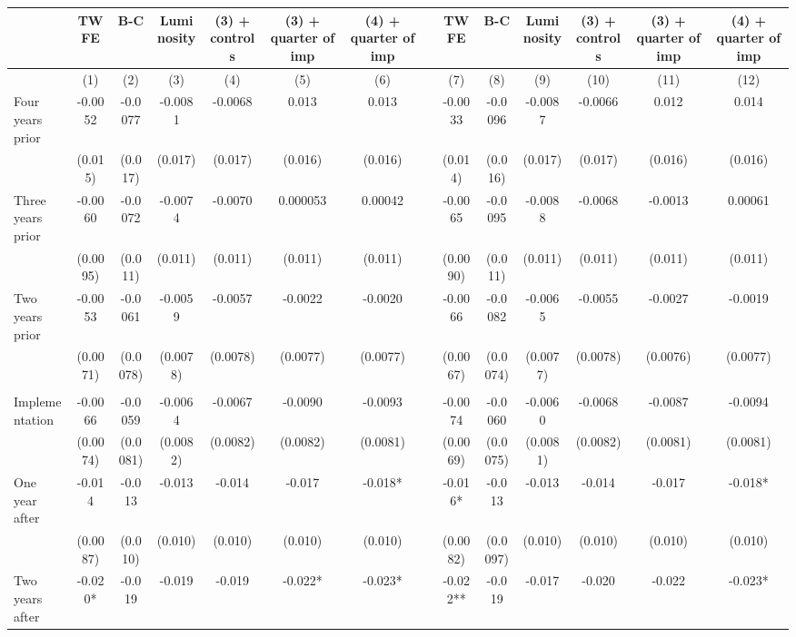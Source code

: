 \begin{tabular}{lccccccccccccc}
\toprule
      & TWFE  & B-C   & Luminosity & (3) + controls & (3) + quarter of imp & (4) + quarter of imp &       & TWFE  & B-C   & Luminosity & (3) + controls & (3) + quarter of imp & (4) + quarter of imp \\
\midrule
      & (1)   & (2)   & (3)   & (4)   & (5)   & (6)   &       & (7)   & (8)   & (9)   & (10)  & (11)  & (12) \\
\midrule
\midrule
Four years prior & -0.0052 & -0.0077 & -0.0081 & -0.0068 & 0.013 & 0.013 &       & -0.0033 & -0.0096 & -0.0087 & -0.0066 & 0.012 & 0.014 \\
      & (0.015) & (0.017) & (0.017) & (0.017) & (0.016) & (0.016) &       & (0.014) & (0.016) & (0.017) & (0.017) & (0.016) & (0.016) \\
Three years prior & -0.0060 & -0.0072 & -0.0074 & -0.0070 & 0.000053 & 0.00042 &       & -0.0065 & -0.0095 & -0.0088 & -0.0068 & -0.0013 & 0.00061 \\
      & (0.0095) & (0.011) & (0.011) & (0.011) & (0.011) & (0.011) &       & (0.0090) & (0.011) & (0.011) & (0.011) & (0.011) & (0.011) \\
Two years prior & -0.0053 & -0.0061 & -0.0059 & -0.0057 & -0.0022 & -0.0020 &       & -0.0066 & -0.0082 & -0.0065 & -0.0055 & -0.0027 & -0.0019 \\
      & (0.0071) & (0.0078) & (0.0078) & (0.0078) & (0.0077) & (0.0077) &       & (0.0067) & (0.0074) & (0.0077) & (0.0078) & (0.0076) & (0.0077) \\
      &       &       &       &       &       &       &       &       &       &       &       &       &  \\
Implementation & -0.0066 & -0.0059 & -0.0064 & -0.0067 & -0.0090 & -0.0093 &       & -0.0074 & -0.0060 & -0.0060 & -0.0068 & -0.0087 & -0.0094 \\
      & (0.0074) & (0.0081) & (0.0082) & (0.0082) & (0.0082) & (0.0081) &       & (0.0069) & (0.0075) & (0.0081) & (0.0082) & (0.0081) & (0.0081) \\
One year after & -0.014 & -0.013 & -0.013 & -0.014 & -0.017 & -0.018* &       & -0.016* & -0.013 & -0.013 & -0.014 & -0.017 & -0.018* \\
      & (0.0087) & (0.010) & (0.010) & (0.010) & (0.010) & (0.010) &       & (0.0082) & (0.0097) & (0.010) & (0.010) & (0.010) & (0.010) \\
Two years after & -0.020* & -0.019 & -0.019 & -0.019 & -0.022* & -0.023* &       & -0.022** & -0.019 & -0.017 & -0.020 & -0.022 & -0.023* \\

\end{tabular}

